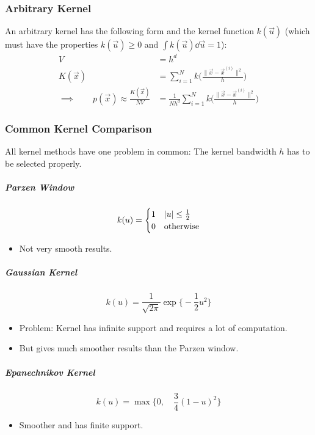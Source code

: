 			\subsubsection{Arbitrary Kernel}
				An arbitrary kernel has the following form and the kernel function \( k(\vec{u}) \) (which must have the properties \( k(\vec{u}) \geq 0 \) and \( \int k(\vec{u}) \dd{\vec{u}} = 1 \)):
				\begin{align}
					V &= h^d \\
					K(\vec{x}) &= \sum_{i = 1}^{N} k\Bigg( \frac{\lVert \vec{x} - \vec{x}^{(i)} \rVert^2}{h} \Bigg) \\
					\implies\qquad p(\vec{x}) \approx \frac{K(\vec{x})}{NV} &= \frac{1}{Nh^d} \sum_{i = 1}^{N} k\Bigg( \frac{\lVert \vec{x} - \vec{x}^{(i)} \rVert^2}{h} \Bigg)
				\end{align}

			\subsubsection{Common Kernel Comparison}
				All kernel methods have one problem in common: The kernel bandwidth \(h\) has to be selected properly.

				\subparagraph{Parzen Window}
				\begin{equation}
					k(u) =
						\begin{cases}
							1 & \abs{u} \leq \frac{1}{2} \\
							0 & \textrm{otherwise}
						\end{cases}
				\end{equation}
				\begin{itemize}
					\item Not very smooth results.
				\end{itemize}

				\subparagraph{Gaussian Kernel}
				\begin{equation}
					k(u) = \frac{1}{\sqrt{2\pi}} \exp\Bigg\{ -\frac{1}{2} u^2 \Bigg\}
				\end{equation}
				\begin{itemize}
					\item Problem: Kernel has infinite support and requires a lot of computation.
					\item But gives much smoother results than the Parzen window.
				\end{itemize}

				\subparagraph{Epanechnikov Kernel}
				\begin{equation}
					k(u) = \max\Bigg\{ 0,\quad \frac{3}{4} (1 - u)^2 \Bigg\}
				\end{equation}
				\begin{itemize}
					\item Smoother and has finite support.
				\end{itemize}

